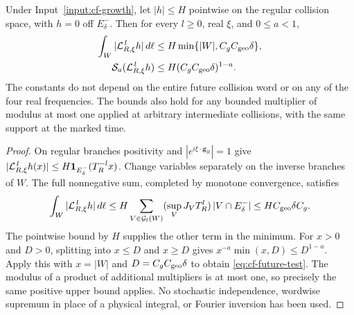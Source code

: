 \begin{theorem}
\label{thm:cf-transfer}
Under Input~\ref{input:cf-growth}, let $|h|\le H$ pointwise on the
regular collision space, with $h=0$ off $E_\delta^-$. Then for every
$l\ge0$, real $\xi$, and $0\le a<1$,
\begin{align}
 \int_W|\mathcal L_{R,\xi}^{\,l}h|\,d\ell
  &\le H\min\{|W|,C_g C_{\rm geo}\delta\},
                                  \label{eq:cf-future-length}\\
 \mathcal S_a(\mathcal L_{R,\xi}^{\,l}h)
  &\le H(C_g C_{\rm geo}\delta)^{1-a}.
                                  \label{eq:cf-future-test}
\end{align}
The constants do not depend on the entire future collision word or
on any of the four real frequencies. The bounds also hold for any
bounded multiplier of modulus at most one applied at arbitrary
intermediate collisions, with the same support at the marked time.
\end{theorem}
\begin{proof}
On regular branches positivity and $|e^{i\xi\cdot\mathbf g_R}|=1$
give
$|\mathcal L_{R,\xi}^{\,l}h(x)|
 \le H\mathbf1_{E_\delta^-}(T_R^{-l}x)$.
Change variables separately on the inverse branches of $W$. The
full nonnegative sum, completed by monotone convergence, satisfies
\[
 \int_W|\mathcal L_{R,\xi}^{\,l}h|\,d\ell
 \le H\sum_{V\in\mathcal G_l(W)}
       (\sup_V J_VT_R^l)\,|V\cap E_\delta^-|
 \le HC_{\rm geo}\delta C_g.
\]
The pointwise bound by $H$ supplies the other term in the minimum.
For $x>0$ and $D>0$, splitting into $x\le D$ and $x\ge D$ gives
$x^{-a}\min(x,D)\le D^{1-a}$. Apply this with
$x=|W|$ and $D=C_gC_{\rm geo}\delta$ to obtain
\eqref{eq:cf-future-test}. The modulus of a product of additional
multipliers is at most one, so precisely the same positive upper
bound applies. No stochastic independence, wordwise supremum in
place of a physical integral, or Fourier inversion has been used.
\end{proof}

